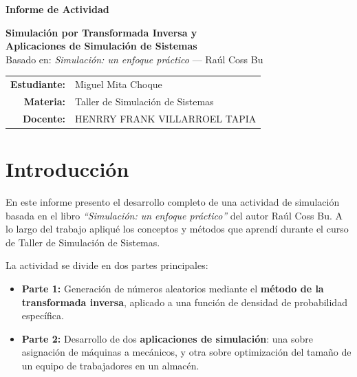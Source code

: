 \documentclass[12pt,a4paper]{article}
\begin{document}
\begin{titlepage}
\centering
\vspace*{1cm}

{\LARGE \textbf{Informe de Actividad}}\\[2cm]

\begin{center}
{\Large \textbf{Simulación por Transformada Inversa y}}\\[0.3cm]
{\Large \textbf{Aplicaciones de Simulación de Sistemas}}\\[0.5cm]
{\normalsize Basado en: \textit{Simulación: un enfoque práctico} — Raúl Coss Bu}
\end{center}

\vspace{2cm}

\begin{tabular}{rl}
\textbf{Estudiante:}   & Miguel Mita Choque \\[0.3cm]
\textbf{Materia:}      & Taller de Simulación de Sistemas \\[0.3cm]
\textbf{Docente:}      & HENRRY FRANK VILLARROEL TAPIA \\[0.3cm]
\end{tabular}

\vfill
\end{titlepage}

\tableofcontents
\newpage

\section{Introducción}

En este informe presento el desarrollo completo de una actividad de simulación basada en el libro \textit{``Simulación: un enfoque práctico''} del autor Raúl Coss Bu. A lo largo del trabajo apliqué los conceptos y métodos que aprendí durante el curso de Taller de Simulación de Sistemas.

La actividad se divide en dos partes principales:

\begin{itemize}
  \item \textbf{Parte 1:} Generación de números aleatorios mediante el \textbf{método de la transformada inversa}, aplicado a una función de densidad de probabilidad específica.
  \item \textbf{Parte 2:} Desarrollo de dos \textbf{aplicaciones de simulación}: una sobre asignación de máquinas a mecánicos, y otra sobre optimización del tamaño de un equipo de trabajadores en un almacén.
\end{itemize}
\end{document}
